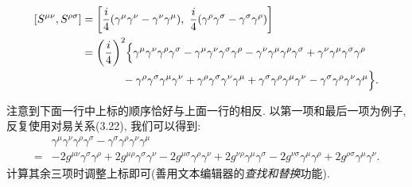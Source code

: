\documentclass[cn,hazy,green,11pt,device=normal,chinesefont=founder]{elegantnote}
\begin{document}
\begin{equation}
  \begin{aligned}
    \relax
    [S^{\mu\nu}, S^{\rho\sigma}] &= \biggl[\frac{i}{4}(\gamma^\mu \gamma^\nu - \gamma^\nu \gamma^\mu), \ \frac{i}{4}(\gamma^\rho \gamma^\sigma - \gamma^\sigma \gamma^\rho)\biggr]\\
    &= \biggl(\frac{i}{4}\biggr)^2 \Bigl\{\gamma^\mu \gamma^\nu \gamma^\rho \gamma^\sigma - \gamma^\mu \gamma^\nu \gamma^\sigma \gamma^\rho - \gamma^\nu \gamma^\mu \gamma^\rho \gamma^\sigma + \gamma^\nu \gamma^\mu \gamma^\sigma \gamma^\rho \\ 
    &\qquad \quad \ \ - \gamma^\rho \gamma^\sigma \gamma^\mu \gamma^\nu + \gamma^\rho \gamma^\sigma \gamma^\nu \gamma^\mu + \gamma^\sigma \gamma^\rho \gamma^\mu \gamma^\nu - \gamma^\sigma \gamma^\rho \gamma^\nu \gamma^\mu \Bigr\}. 
  \end{aligned}
\end{equation}

注意到下面一行中上标的顺序恰好与上面一行的相反. 以第一项和最后一项为例子, 反复使用对易关系(3.22), 我们可以得到: 
\begin{equation}
  \begin{aligned}
    &\gamma^\mu \gamma^\nu \gamma^\rho \gamma^\sigma - \gamma^\sigma \gamma^\rho \gamma^\nu \gamma^\mu \\
    = &- 2g^{\mu\nu}\gamma^\sigma \gamma^\rho + 2g^{\mu\rho}\gamma^\sigma \gamma^\nu - 2g^{\mu\sigma}\gamma^\rho \gamma^\nu + 2g^{\nu\rho}\gamma^\mu \gamma^\sigma - 2g^{\nu\sigma}\gamma^\mu \gamma^\rho + 2g^{\rho\sigma}\gamma^\mu \gamma^\nu. 
  \end{aligned}
\end{equation}
计算其余三项时调整上标即可(善用文本编辑器的\textit{查找和替换}功能). 
\end{document}

